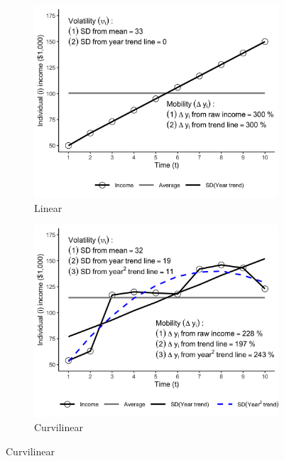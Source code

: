 \documentclass[12pt]{article}
\begin{document}
\begin{figure}[htp!]
        \begin{subfigure}[b]{0.45\textwidth}
        \includegraphics[width=\textwidth]{../graphs/example_3.png}
        \caption{Linear}
        \label{examples_sub3}
    \end{subfigure}
    \begin{subfigure}[b]{0.45\textwidth}
        \includegraphics[width=\textwidth]{../graphs/example_psid.png}
        \caption{Curvilinear}
        \label{examples_sub4}
    \end{subfigure}
\end{figure}
\end{document}
